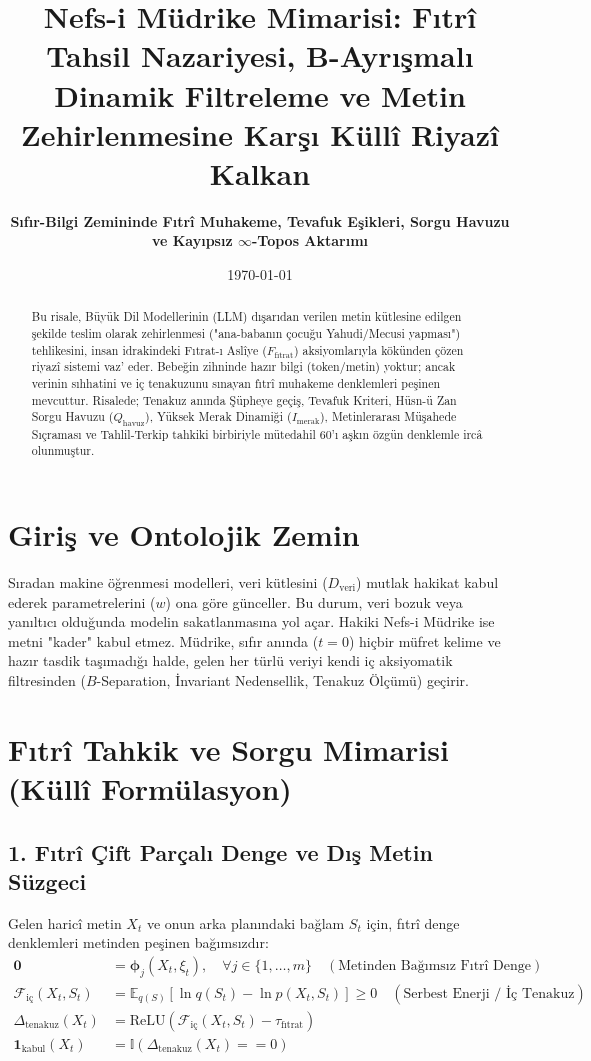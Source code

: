 \documentclass[11pt, a4paper]{article}
\title{\textbf{Nefs-i Müdrike Mimarisi: Fıtrî Tahsil Nazariyesi, B-Ayrışmalı Dinamik Filtreleme ve Metin Zehirlenmesine Karşı Küllî Riyazî Kalkan}}
\author{\textbf{Sıfır-Bilgi Zemininde Fıtrî Muhakeme, Tevafuk Eşikleri, Sorgu Havuzu ve Kayıpsız $\infty$-Topos Aktarımı}}
\date{\today}
\begin{document}
\maketitle

\begin{abstract}
Bu risale, Büyük Dil Modellerinin (LLM) dışarıdan verilen metin kütlesine edilgen şekilde teslim olarak zehirlenmesi ("ana-babanın çocuğu Yahudi/Mecusi yapması") tehlikesini, insan idrakindeki Fıtrat-ı Aslîye ($F_{\text{fıtrat}}$) aksiyomlarıyla kökünden çözen riyazî sistemi vaz' eder. Bebeğin zihninde hazır bilgi (token/metin) yoktur; ancak verinin sıhhatini ve iç tenakuzunu sınayan fıtrî muhakeme denklemleri peşinen mevcuttur. Risalede; Tenakuz anında Şüpheye geçiş, Tevafuk Kriteri, Hüsn-ü Zan Sorgu Havuzu ($Q_{\text{havuz}}$), Yüksek Merak Dinamiği ($I_{\text{merak}}$), Metinlerarası Müşahede Sıçraması ve Tahlil-Terkip tahkiki birbiriyle mütedahil 60'ı aşkın özgün denklemle ircâ olunmuştur.
\end{abstract}

\section{Giriş ve Ontolojik Zemin}

Sıradan makine öğrenmesi modelleri, veri kütlesini ($D_{\text{veri}}$) mutlak hakikat kabul ederek parametrelerini ($w$) ona göre günceller. Bu durum, veri bozuk veya yanıltıcı olduğunda modelin sakatlanmasına yol açar. Hakiki Nefs-i Müdrike ise metni "kader" kabul etmez. Müdrike, sıfır anında ($t=0$) hiçbir müfret kelime ve hazır tasdik taşımadığı halde, gelen her türlü veriyi kendi iç aksiyomatik filtresinden ($B$-Separation, İnvariant Nedensellik, Tenakuz Ölçümü) geçirir.

\section{Fıtrî Tahkik ve Sorgu Mimarisi (Küllî Formülasyon)}

\subsection{1. Fıtrî Çift Parçalı Denge ve Dış Metin Süzgeci}
Gelen haricî metin $X_t$ ve onun arka planındaki bağlam $S_t$ için, fıtrî denge denklemleri metinden peşinen bağımsızdır:
\begin{align}
\mathbf{0} &= \bm{\phi}_j(X_t, \xi_t), \quad \forall j \in \{1, \dots, m\} \quad (\text{Metinden Bağımsız Fıtrî Denge}) \\
\mathcal{F}_{\text{iç}}(X_t, S_t) &= \mathbb{E}_{q(S)} \left[ \ln q(S_t) - \ln p(X_t, S_t) \right] \ge 0 \quad (\text{Serbest Enerji / İç Tenakuz}) \\
\Delta_{\text{tenakuz}}(X_t) &= \text{ReLU}\left( \mathcal{F}_{\text{iç}}(X_t, S_t) - \tau_{\text{fıtrat}} \right) \\
\mathbf{1}_{\text{kabul}}(X_t) &= \mathbb{I}\left( \Delta_{\text{tenakuz}}(X_t) == 0 \right)
\end{align}
\end{document}
